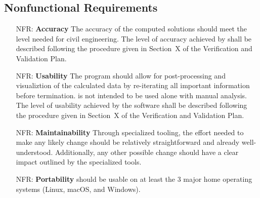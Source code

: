 \documentclass[12pt]{article}
\newcounter{nfrnum} %
\begin{document}

\subsection{Nonfunctional Requirements}

\noindent\begin{itemize}

    \item[NFR\refstepcounter{nfrnum}\thenfrnum \label{NFR_Accuracy}:]
        \textbf{Accuracy} The accuracy of the computed solutions should meet the
            level needed for civil engineering.  The level of accuracy achieved
            by \progname{} shall be described following the procedure given in
            Section~X of the Verification and
            Validation Plan.

    \item[NFR\refstepcounter{nfrnum}\thenfrnum \label{NFR_Usability}:]
        \textbf{Usability} The program should allow for post-processing and
        visualiztion of the calculated data by re-iterating all important
        information before termination. \progname{} is not intended to be used
        alone with manual analysis. The level of usability achieved by the
        software shall be described following the procedure given in
        Section~X of the Verification and Validation
        Plan.

    \item[NFR\refstepcounter{nfrnum}\thenfrnum \label{NFR_Maintainability}:]
        \textbf{Maintainability} Through specialized tooling, the effort needed
        to make any likely change should be relatively straightforward and
        already well-understood. Additionally, any other possible change should
        have a clear impact outlined by the specialized tools.

    \item[NFR\refstepcounter{nfrnum}\thenfrnum \label{NFR_Portability}:]
        \textbf{Portability} \progname{} should be usable on at least the 3
            major home operating systems (Linux, macOS, and Windows).

\end{itemize}


\end{document}
